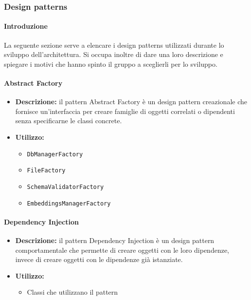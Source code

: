 \subsubsection{Design patterns}
\paragraph{Introduzione}
\par La seguente sezione serve a elencare i design patterns utilizzati durante lo sviluppo dell'architettura. Si occupa inoltre di dare una loro descrizione e spiegare i motivi che hanno spinto il gruppo a sceglierli per lo sviluppo.

\paragraph{Abstract Factory}
\begin{itemize}
    \item{\textbf{Descrizione:}} il pattern Abstract Factory è un design pattern creazionale che fornisce un'interfaccia per creare famiglie di oggetti correlati o dipendenti senza specificarne le classi concrete.
    \item{\textbf{Utilizzo:}}
    \begin{itemize}
        \item \texttt{DbManagerFactory}
        \item \texttt{FileFactory}
        \item \texttt{SchemaValidatorFactory}
        \item \texttt{EmbeddingsManagerFactory}
    \end{itemize}
\end{itemize}

\paragraph{Dependency Injection}
\begin{itemize}
    \item{\textbf{Descrizione:}} il pattern Dependency Injection è un design pattern comportamentale che permette di creare oggetti con le loro dipendenze, invece di creare oggetti con le dipendenze già istanziate.
    \item{\textbf{Utilizzo:}}
    \begin{itemize}
        \item Classi che utilizzano il pattern
    \end{itemize}
\end{itemize}

